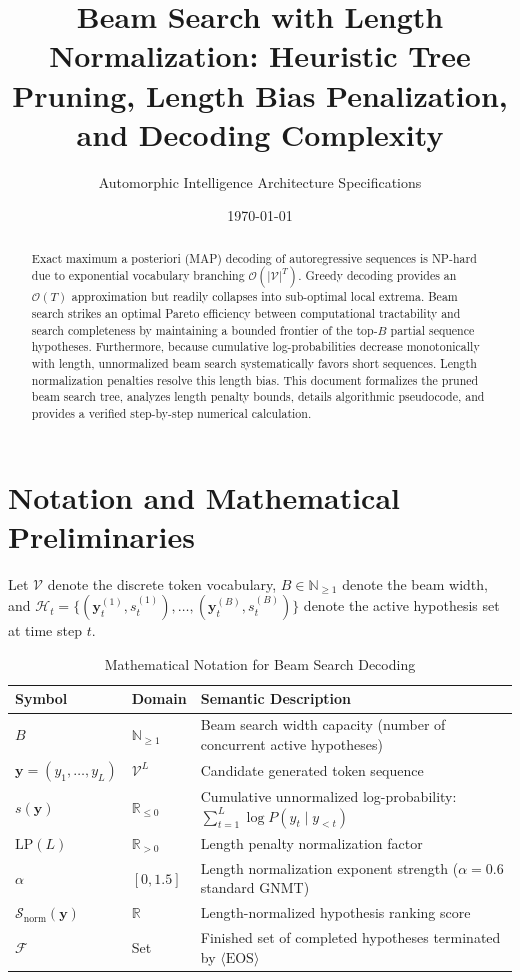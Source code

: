 \documentclass[11pt,a4paper]{article}
\title{Beam Search with Length Normalization: Heuristic Tree Pruning, Length Bias Penalization, and Decoding Complexity}
\author{Automorphic Intelligence Architecture Specifications}
\date{\today}
\theoremstyle{definition}
\begin{document}
\maketitle

\begin{abstract}
Exact maximum a posteriori (MAP) decoding of autoregressive sequences is NP-hard due to exponential vocabulary branching $\mathcal{O}(|\mathcal{V}|^T)$. Greedy decoding provides an $\mathcal{O}(T)$ approximation but readily collapses into sub-optimal local extrema. Beam search strikes an optimal Pareto efficiency between computational tractability and search completeness by maintaining a bounded frontier of the top-$B$ partial sequence hypotheses. Furthermore, because cumulative log-probabilities decrease monotonically with length, unnormalized beam search systematically favors short sequences. Length normalization penalties resolve this length bias. This document formalizes the pruned beam search tree, analyzes length penalty bounds, details algorithmic pseudocode, and provides a verified step-by-step numerical calculation.
\end{abstract}

\section{Notation and Mathematical Preliminaries}

Let $\mathcal{V}$ denote the discrete token vocabulary, $B \in \mathbb{N}_{\ge 1}$ denote the beam width, and $\mathcal{H}_t = \{(\mathbf{y}_t^{(1)}, s_t^{(1)}), \dots, (\mathbf{y}_t^{(B)}, s_t^{(B)})\}$ denote the active hypothesis set at time step $t$.

\begin{table}[h]
\centering
\caption{Mathematical Notation for Beam Search Decoding}
\begin{tabular}{lll}
\toprule
\textbf{Symbol} & \textbf{Domain} & \textbf{Semantic Description} \\
\midrule
$B$ & $\mathbb{N}_{\ge 1}$ & Beam search width capacity (number of concurrent active hypotheses) \\
$\mathbf{y} = (y_1, \dots, y_L)$ & $\mathcal{V}^L$ & Candidate generated token sequence \\
$s(\mathbf{y})$ & $\mathbb{R}_{\le 0}$ & Cumulative unnormalized log-probability: $\sum_{t=1}^L \log P(y_t \mid y_{<t})$ \\
$\text{LP}(L)$ & $\mathbb{R}_{> 0}$ & Length penalty normalization factor \\
$\alpha$ & $[0, 1.5]$ & Length normalization exponent strength ($\alpha = 0.6$ standard GNMT) \\
$\mathcal{S}_{\text{norm}}(\mathbf{y})$ & $\mathbb{R}$ & Length-normalized hypothesis ranking score \\
$\mathcal{F}$ & Set & Finished set of completed hypotheses terminated by $\langle \text{EOS} \rangle$ \\
\bottomrule
\end{tabular}
\end{table}
\end{document}
